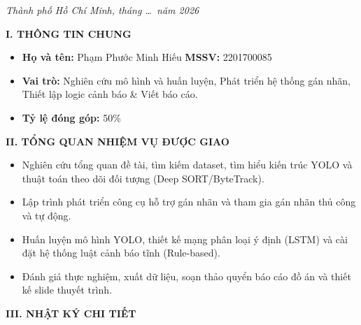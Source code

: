 \documentclass[12pt,a4paper]{report}
\begin{document}
	\vfill
	
	\begin{center}
		\textit{Thành phố Hồ Chí Minh, tháng \dots\ năm 2026}
	\end{center}
\newpage

\textbf{I. THÔNG TIN CHUNG}
\begin{itemize}
	\item \textbf{Họ và tên:} Phạm Phước Minh Hiếu \hspace{1cm} \textbf{MSSV:} 2201700085
	\item \textbf{Vai trò:} Nghiên cứu mô hình và huấn luyện, Phát triển hệ thống gán nhãn, Thiết lập logic cảnh báo \& Viết báo cáo.
	\item \textbf{Tỷ lệ đóng góp:} 50\%
\end{itemize}

\textbf{II. TỔNG QUAN NHIỆM VỤ ĐƯỢC GIAO}
\begin{itemize}
	\item Nghiên cứu tổng quan đề tài, tìm kiếm dataset, tìm hiểu kiến trúc YOLO và thuật toán theo dõi đối tượng (Deep SORT/ByteTrack).
	\item Lập trình phát triển công cụ hỗ trợ gán nhãn và tham gia gán nhãn thủ công và tự động.
	\item Huấn luyện mô hình YOLO, thiết kế mạng phân loại ý định (LSTM) và cài đặt hệ thống luật cảnh báo tĩnh (Rule-based).
	\item Đánh giá thực nghiệm, xuất dữ liệu, soạn thảo quyển báo cáo đồ án và thiết kế slide thuyết trình.
\end{itemize}

\textbf{III. NHẬT KÝ CHI TIẾT}
\end{document}
